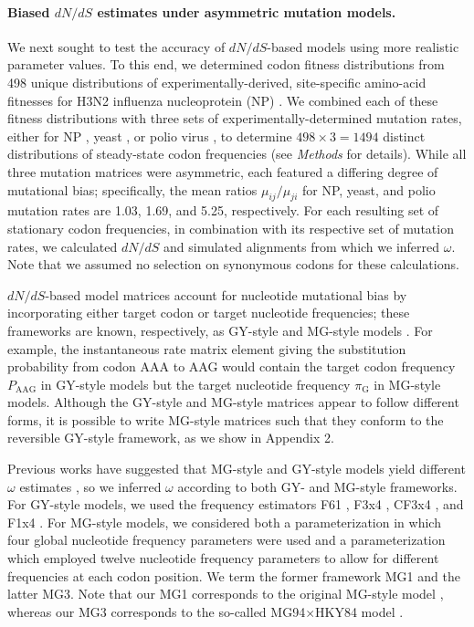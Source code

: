 \documentclass{pnastwo}
\begin{document}
\begin{article}
\paragraph{Biased $dN/dS$ estimates under asymmetric mutation models.}
We next sought to test the accuracy of $dN/dS$-based models using more realistic parameter values. To this end, we determined codon fitness distributions from 498 unique distributions of experimentally-derived, site-specific amino-acid fitnesses for H3N2 influenza nucleoprotein (NP) \cite{Bloom2014a}. We combined each of these fitness distributions with three sets of experimentally-determined mutation rates, either for NP \cite{Bloom2014a}, yeast \cite{Zhu2014}, or polio virus \cite{Acevedo2014}, to determine $498 \times 3 = 1494$ distinct distributions of steady-state codon frequencies (see \emph{Methods} for details). While all three mutation matrices were asymmetric, each featured a differing degree of mutational bias; specifically, the mean ratios $\mu_{ij} / \mu_{ji}$ for NP, yeast, and polio mutation rates are 1.03, 1.69, and 5.25, respectively. For each resulting set of stationary codon frequencies, in combination with its respective set of mutation rates, we calculated $dN/dS$ and simulated alignments from which we inferred $\omega$. Note that we assumed no selection on synonymous codons for these calculations.

$dN/dS$-based model matrices account for nucleotide mutational bias by incorporating either target codon \cite{GoldmanYang1994} or target nucleotide \cite{MuseGaut1994} frequencies; these frameworks are known, respectively, as GY-style and MG-style models \cite{KosakovskyPond2010}. For example, the instantaneous rate matrix element giving the substitution probability from codon AAA to AAG would contain the target codon frequency $P_\text{AAG}$ in GY-style models but the target nucleotide frequency $\pi_\text{G}$ in MG-style models. Although the GY-style and MG-style matrices appear to follow different forms, it is possible to write MG-style matrices such that they conform to the reversible GY-style framework, as we show in Appendix 2.

Previous works have suggested that MG-style and GY-style models yield different $\omega$ estimates \cite{KosakovskyPondMuse2005,Yap2010}, so we inferred $\omega$ according to both GY- and MG-style frameworks. For GY-style models, we used the frequency estimators F61 \cite{GoldmanYang1994}, F3x4 \cite{GoldmanYang1994}, CF3x4 \cite{KosakovskyPond2010}, and F1x4 \cite{MuseGaut1994}. For MG-style models, we considered both a parameterization in which four global nucleotide frequency parameters were used and a parameterization which employed twelve nucleotide frequency parameters to allow for different frequencies at each codon position. We term the former framework MG1 and the latter MG3. Note that our MG1 corresponds to the original MG-style model \cite{MuseGaut1994}, whereas our MG3 corresponds to the so-called MG94$\times$HKY84 model \cite{KosakovskyPondMuse2005}. 


\end{article}
\end{document}
